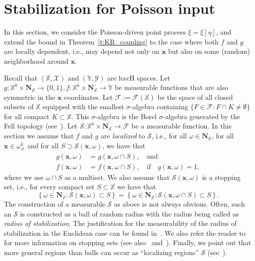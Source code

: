 \documentclass[10pt]{amsart}
\theoremstyle{definition}\newtheorem{defi}[theo]{Definition}\newtheorem{rema}[theo]{Remark}\newtheorem{exam}[theo]{Example}\newtheorem{exem}[theo]{Example}\newtheorem{nota}[theo]{Notation}
\newcommand*\bN{\mathbf{N}}
\newcommand{\bx}{\mathbf{x}}
\newcommand*\X{\mathbb{X}}
\newcommand*\Y{\mathbb{Y}}
\newcommand*\cF{\mathcal{F}}
\newcommand*\cS{\mathcal{S}}
\newcommand*\cX{\mathcal{X}}
\newcommand*\cY{\mathcal{Y}}
\newcommand{\set}[1]{\left\{#1\right\}}
\begin{document}
\section{Stabilization for Poisson input}\label{s:locdep}

In this section, we consider the Poisson-driven point process $\xi = \xi[\eta]$, and extend the bound in Theorem~\ref{t:KR_coupling} to the case where both $f$ and $g$ are locally dependent, i.e., may depend not only on $\bx$ but also on some (random) neighborhood around $\bx$.

Recall that $(\X,\cX)$ and $(\Y,\cY)$ are lcscH spaces. Let $g : \X^k \times \bN_{\X} \to \{0,1\}, f : \X^k \times \bN_{\X} \to \Y$ be measurable functions that are also symmetric in the $\bx$ coordinates. Let $\cF := \cF(\X)$ be the space of all closed subsets of $\X$ equipped with the smallest $\sigma$-algebra containing $\{F \in \cF : F \cap K \neq \emptyset\}$ for all compact $K \subset \X$. This $\sigma$-algebra is the Borel $\sigma$-algebra generated by the Fell topology (see~\cite[Chapter~9]{Baccelli2020}). Let $\cS : \X^{k} \times \bN_{\X} \to \cF$ be a measurable function. In this section we assume that $f$ and $g$ are \emph{localized} to $\cS$, i.e., for all $\omega \in \bN_{\X}$, for all $\bx \in \omega^k_{\ne}$ and for all $S \supset \cS(\bx,\omega)$, we have that
\begin{equation}\label{e:AssumptionRi}
\begin{split}
g(\bx,\omega)&=g(\bx,\omega \cap S),\quad\text{and} \\
f(\bx,\omega)&=f(\bx,\omega\cap S), \quad \text{if} \quad g(\bx,\omega)=1,
\end{split}
\end{equation}
where we use $\omega \cap S$ as a multiset. We also assume that $\cS({\bx},\omega)$ is a stopping set, i.e., for every compact set $S\subset \X$ we have that
\begin{equation}\label{e:stoppingset}
\set{\omega \in \bN_{\X} : \cS({\bx},\omega)\subset S} = \set{ \omega \in \bN_{\X} : \cS(\bx, \omega \cap S) \subset S}.
\end{equation}
The construction of a measurable $\cS$ as above is not always obvious. Often, such an $\cS$ is {constructed as a ball of random radius with the radius being called as {\em radius of stabilization}}. The justification for the measurability of the radius of stabilization {in the Euclidean case} can be found in~\cite[Definition~2.1 and below]{penrose_lln_2007}. We also refer the reader to~\cite[Section~2]{Otto2020} for more information on stopping sets (see also~\cite[Appendix A]{BaumstarkLast09} and~\cite[Appendix A]{Last2021}). Finally, we point out that more general regions than balls can occur as ``localizing regions'' $\cS$ (see~\cite{Bhattacharjee2021}). 
\end{document}

